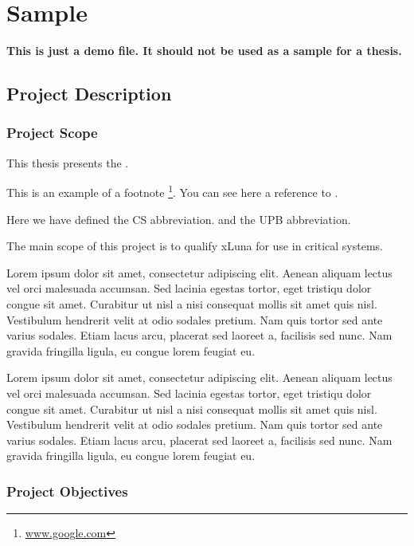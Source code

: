 \chapter{Sample}
\label{chapter:sample}

\textbf{This is just a demo file. It should not be used as a sample for a thesis.}\\

\section{Project Description}
\label{sec:proj}

\subsection{Project Scope}
\label{sub-sec:proj-scope}

This thesis presents the \textbf{\project}.

This is an example of a footnote \footnote{\url{www.google.com}}. You can see here a reference to .

Here we have defined the CS abbreviation. and the UPB abbreviation.

The main scope of this project is to qualify xLuna for use in critical systems.


Lorem ipsum dolor sit amet, consectetur adipiscing elit. Aenean aliquam lectus vel orci malesuada accumsan. Sed lacinia egestas tortor, eget tristiqu dolor congue sit amet. Curabitur ut nisl a nisi consequat mollis sit amet quis nisl. Vestibulum hendrerit velit at odio sodales pretium. Nam quis tortor sed ante varius sodales. Etiam lacus arcu, placerat sed laoreet a, facilisis sed nunc. Nam gravida fringilla ligula, eu congue lorem feugiat eu.

Lorem ipsum dolor sit amet, consectetur adipiscing elit. Aenean aliquam lectus vel orci malesuada accumsan. Sed lacinia egestas tortor, eget tristiqu dolor congue sit amet. Curabitur ut nisl a nisi consequat mollis sit amet quis nisl. Vestibulum hendrerit velit at odio sodales pretium. Nam quis tortor sed ante varius sodales. Etiam lacus arcu, placerat sed laoreet a, facilisis sed nunc. Nam gravida fringilla ligula, eu congue lorem feugiat eu.


\subsection{Project Objectives}
\label{sub-sec:proj-objectives}

